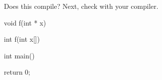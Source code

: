 Does this compile? Next, check with your compiler.



\begin{consolethree}[escapeinside=||]

void f(int * x) {}

int f(int x[]) {}



int main()

{

    return 0;

}

\end{consolethree}

